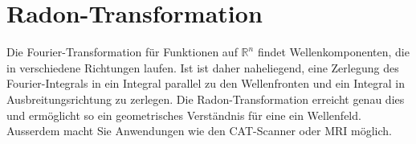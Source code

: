 %
%
%
\chapter{Radon-Transformation
\label{buch:chapter:radon}}
Die Fourier-Transformation für Funktionen auf $\mathbb{R}^n$ findet
Wellenkomponenten, die in verschiedene Richtungen laufen. 
Ist ist daher naheliegend, eine Zerlegung des Fourier-Integrals in
ein Integral parallel zu den Wellenfronten und ein Integral in 
Ausbreitungsrichtung zu zerlegen.
Die Radon-Transformation erreicht genau dies und ermöglicht so
ein geometrisches Verständnis für eine ein Wellenfeld.
Ausserdem macht Sie Anwendungen wie den CAT-Scanner oder 
MRI möglich.







